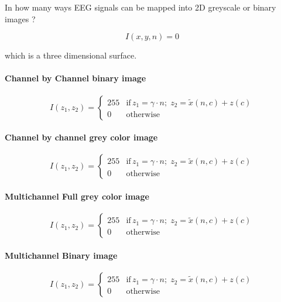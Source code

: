 In how many ways EEG signals can be mapped into 2D greyscale or binary images ?

\begin{equation}
I(x,y,n) = 0
\label{eq:standarizedaverages}
\end{equation}

which is a three dimensional surface.

\paragraph{Channel by Channel binary image }
\begin{equation}
I(z_1,z_2) = \left\{ \begin{array}{rl}
255 & \text{if} \,  z_1 = \gamma \cdot n; \; z_2 = \tilde{x}(n,c) + z(c) \\
0   & \mbox{otherwise}
\end{array}\right.
\label{eq:images}
\end{equation}
\paragraph{Channel by channel grey color image}
\begin{equation}
I(z_1,z_2) = \left\{ \begin{array}{rl}
255 & \text{if} \,  z_1 = \gamma \cdot n; \; z_2 = \tilde{x}(n,c) + z(c) \\
0   & \mbox{otherwise}
\end{array}\right.
\label{eq:images}
\end{equation}
\paragraph{Multichannel Full grey color image}
\begin{equation}
I(z_1,z_2) = \left\{ \begin{array}{rl}
255 & \text{if} \,  z_1 = \gamma \cdot n; \; z_2 = \tilde{x}(n,c) + z(c) \\
0   & \mbox{otherwise}
\end{array}\right.
\label{eq:images}
\end{equation}
\paragraph{Multichannel Binary image}
\begin{equation}
I(z_1,z_2) = \left\{ \begin{array}{rl}
255 & \text{if} \,  z_1 = \gamma \cdot n; \; z_2 = \tilde{x}(n,c) + z(c) \\
0   & \mbox{otherwise}
\end{array}\right.
\label{eq:images}
\end{equation}
